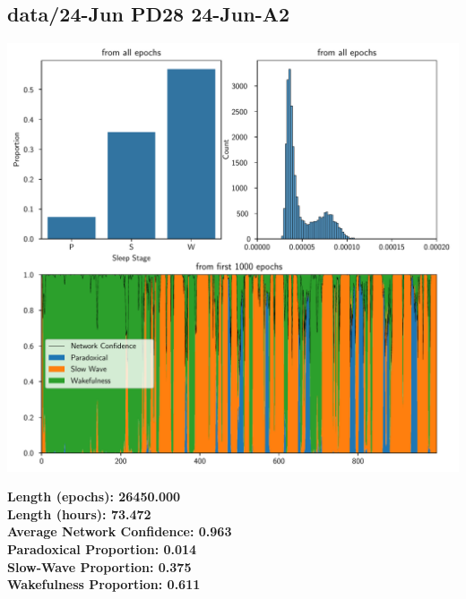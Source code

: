         \subsection*{ data/24-Jun PD28 24-Jun-A2 }
        \begin{center}
        \begin{adjustbox}{width=1\textwidth}
        \includegraphics[page=10]{figs.pdf}
        \end{adjustbox}
        \end{center}
        \large\textbf{Length (epochs): 26450.000}\\
        \textbf{Length (hours): 73.472}\\
        \textbf{Average Network Confidence: 0.963}\\
        \textbf{Paradoxical Proportion: 0.014}\\
        \textbf{Slow-Wave Proportion: 0.375}\\
        \textbf{Wakefulness Proportion: 0.611}\\
        
